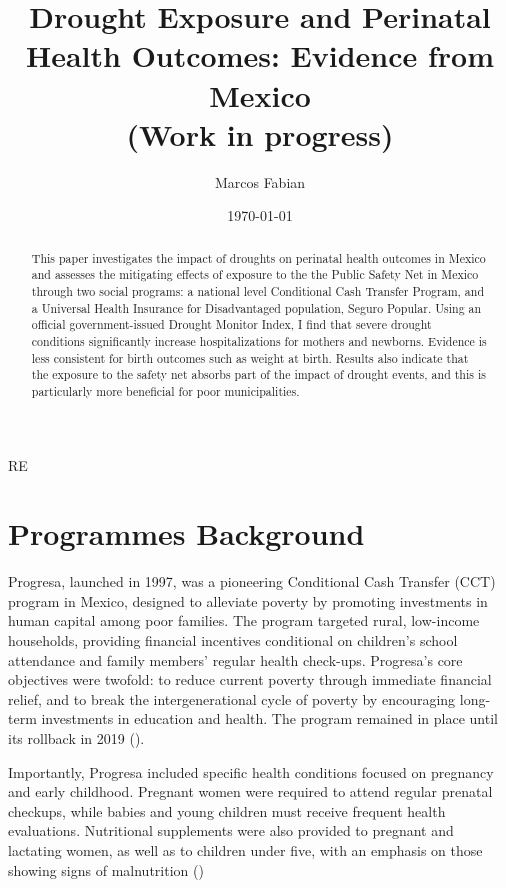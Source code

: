 \documentclass[12pt, oneside]{article}      %
\title{{Drought Exposure and Perinatal Health Outcomes: Evidence from Mexico} \vspace{1cm} \\ \large{(Work in progress)}}
\author{Marcos Fabian}
\date{\today}
\begin{document}
\maketitle



\begin{abstract}

This paper investigates the impact of droughts on perinatal health outcomes in Mexico and assesses the mitigating effects of exposure to the the Public Safety Net in Mexico through two social programs: a national level Conditional Cash Transfer Program, and a Universal Health Insurance for Disadvantaged population, Seguro Popular. Using an official government-issued Drought Monitor Index, I find that severe drought conditions significantly increase hospitalizations for mothers and newborns. Evidence is less consistent for birth outcomes such as weight at birth. Results also indicate that the exposure to the safety net absorbs part of the impact of drought events, and this is particularly more beneficial for poor municipalities.


\end{abstract}

\clearpage
\newpage


RE
\section{Programmes Background}

Progresa, launched in 1997, was a pioneering Conditional Cash Transfer (CCT) program in Mexico, designed to alleviate poverty by promoting investments in human capital among poor families. The program targeted rural, low-income households, providing financial incentives conditional on children's school attendance and family members’ regular health check-ups. Progresa's core objectives were twofold: to reduce current poverty through immediate financial relief, and to break the intergenerational cycle of poverty by encouraging long-term investments in education and health. The program remained in place until its rollback in 2019 (\cite{Parker2023}).

Importantly, Progresa included specific health conditions focused on pregnancy and early childhood. Pregnant women were required to attend regular prenatal checkups, while babies and young children must receive frequent health evaluations. Nutritional supplements were also provided to pregnant and lactating women, as well as to children under five, with an emphasis on those showing signs of malnutrition (\cite{Parker2017})
\end{document}
